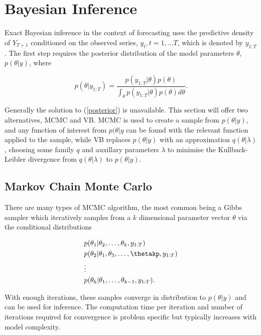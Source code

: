 \documentclass{article}\usepackage[]{graphicx}\usepackage[]{color}
\begin{document}
\section{Bayesian Inference}

Exact Bayesian inference in the context of forecasting uses the predictive density of $Y_{T+1}$ conditioned on the observed series, $y_{t}, t = 1, \dots T$, which is denoted by $y_{1:T}$. The first step requires the posterior distribution of the model parameters $\theta$, $p(\theta | y)$, where

\begin{equation}
\label{posterior}
 p(\theta | y_{1:T}) = \frac{p(y_{1:T}|\theta)p(\theta)}{\int_\theta p(y_{1:T}|\theta)p(\theta) d\theta}.
\end{equation}

Generally the solution to (\ref{posterior}) is unavailable. This section will offer two alternatives, MCMC and VB.
MCMC is used to create a sample from $p(\theta | y)$, and any function of interest from $p(\theta | y$ can be found with the relevant function applied to the sample, while VB replaces $p(\theta | y)$ with an approximation $q(\theta | \lambda)$, choosing some family $q$ and auxillary parameters $\lambda$ to minimise the Kullback-Leibler divergence from $q(\theta | \lambda)$ to $p(\theta | y)$.

\subsection{Markov Chain Monte Carlo}

There are many types of MCMC algorithm, the most common being a Gibbs sampler which iteratively samples from a $k$ dimensional parameter vector $\theta$ via the conditional distributions

\begin{align}
&p(\theta_1 | \theta_2, \dots, \theta_k, y_{1:T}) \nonumber \\
&p(\theta_2 | \theta_1, \theta_3, \dots, \thetakp, y_{1:T}) \nonumber \\
&\vdots \nonumber \\
&p(\theta_k | \theta_1, \dots, \theta_{k-1}, y_{1:T}). \nonumber
\end{align}

With enough iterations, these samples converge in distribution to $p(\theta | y)$ and can be used for inference. The computation time per iteration and number of iterations required for convergence is problem specific but typically increases with model complexity. 
\end{document}

